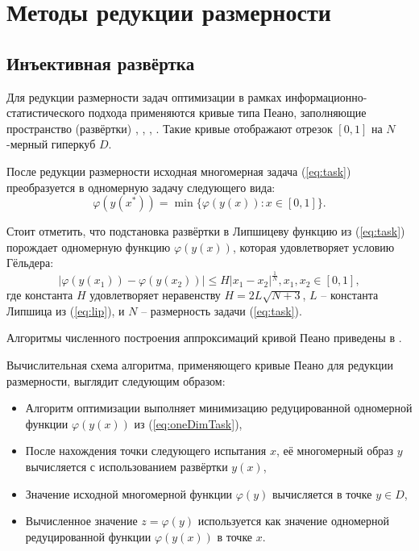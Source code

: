 \section{Методы редукции размерности}
\subsection{Инъективная развёртка}

Для редукции размерности задач оптимизации в рамках информационно-статистического подхода
применяются кривые типа Пеано, заполняющие пространство (развёртки) \cite{sergeyevStronginLera2013}, \cite{strongin1978},
\cite{stronginGergelBarkalovParGO}, \cite{strSergGO}. Такие кривые отображают
отрезок \([0,1]\) на \(N\)-мерный гиперкуб \(D\).

\par
После редукции размерности исходная многомерная задача (\ref{eq:task}) преобразуется в одномерную задачу
следующего вида:
\begin{equation}
\label{eq:oneDimTask}
\varphi(y(x^*))=\min\{\varphi(y(x)):x\in [0,1]\}.
\end{equation}
\par
Стоит отметить, что подстановка развёртки в Липшицеву функцию  %
из (\ref{eq:task}) порождает одномерную функцию \(\varphi(y(x))\), которая удовлетворяет условию Гёльдера:
\begin{equation}
\label{eq:holder}
|\varphi(y(x_1))-\varphi(y(x_2))|\leq H{|x_1-x_2|}^{\frac{1}{N}}, x_1,x_2\in[0,1],
\end{equation}
где константа $H$ удовлетворяет неравенству \(H=2L\sqrt{N+3}\), \(L\) -- константа Липшица из (\ref{eq:lip}),
и \(N\) -- размерность задачи (\ref{eq:task}).
\par
Алгоритмы численного построения аппроксимаций кривой Пеано приведены в \cite{strSergGO}.

\par
Вычислительная схема алгоритма, применяющего кривые Пеано для редукции размерности, выглядит следующим образом:
\begin{itemize}
  \item Алгоритм оптимизации выполняет минимизацию редуцированной одномерной функции
  \(\varphi(y(x))\) из (\ref{eq:oneDimTask}),
  \item После нахождения точки следующего испытания \(x\), её многомерный образ \(y\)
  вычисляется с использованием развёртки \(y(x)\),
  \item Значение исходной многомерной функции \(\varphi(y)\) вычисляется в точке \(y\in D\),
  \item Вычисленное значение \(z=\varphi(y)\) используется как значение одномерной редуцированной функции \(\varphi(y(x))\) в точке \(x\).
\end{itemize}

